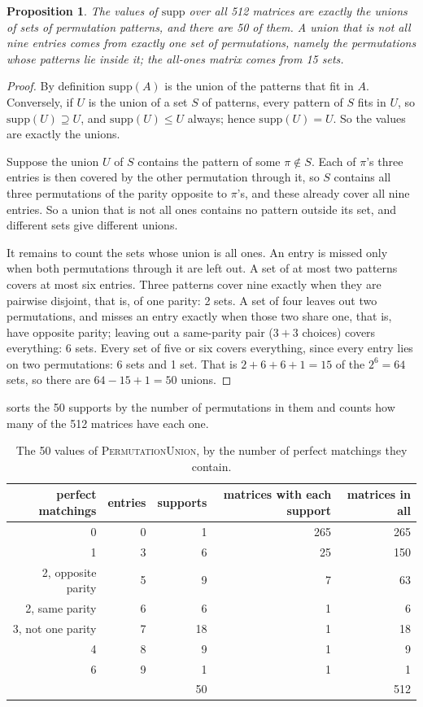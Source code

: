 \documentclass[11pt]{article}
\newtheorem{proposition}[theorem]{Proposition}
\theoremstyle{definition}
\theoremstyle{plain}
\let\origtextsc\textsc
\renewcommand{\textsc}[1]{\textup{\origtextsc{#1}}}
\begin{document}
\begin{proposition}
\label{prop:fifty}
The values of $\mathrm{supp}$ over all 512 matrices are exactly the unions of sets of permutation patterns, and there
are 50 of them. A union that is not all nine entries comes from exactly one set of permutations, namely the
permutations whose patterns lie inside it; the all-ones matrix comes from 15 sets.
\end{proposition}
\begin{proof}
By definition $\mathrm{supp}(A)$ is the union of the patterns that fit in $A$. Conversely, if $U$ is the union of a
set $S$ of patterns, every pattern of $S$ fits in $U$, so $\mathrm{supp}(U)\supseteq U$, and $\mathrm{supp}(U)\le U$
always; hence $\mathrm{supp}(U)=U$. So the values are exactly the unions.

Suppose the union $U$ of $S$ contains the pattern of some $\pi\notin S$. Each of $\pi$'s three entries is then covered by
the other permutation through it, so $S$ contains all three permutations of the parity opposite to $\pi$'s, and these
already cover all nine entries. So a union that is not all ones contains no pattern outside its set, and different
sets give different unions.

It remains to count the sets whose union is all ones. An entry is missed only when both permutations through it are
left out. A set of at most two patterns covers at most six entries. Three patterns cover nine exactly when they are
pairwise disjoint, that is, of one parity: 2 sets. A set of four leaves out two permutations, and misses an entry
exactly when those two share one, that is, have opposite parity; leaving out a same-parity pair ($3+3$ choices) covers
everything: 6 sets. Every set of five or six covers everything, since every entry lies on two permutations: 6 sets and
1 set. That is $2+6+6+1=15$ of the $2^6=64$ sets, so there are $64-15+1=50$ unions.
\end{proof}

 sorts the 50 supports by the number of permutations in them and counts how many of the 512 matrices
have each one.

\begin{table}[h]
\centering
\caption{The 50 values of \textsc{PermutationUnion}, by the number of perfect matchings they contain.}
\label{tab:fifty}
\small
\begin{tabular}{rrrrr}
\toprule
perfect matchings & entries & supports & matrices with each support & matrices in all \\
\midrule
0 & 0 & 1 & 265 & 265 \\
1 & 3 & 6 & 25 & 150 \\
2, opposite parity & 5 & 9 & 7 & 63 \\
2, same parity & 6 & 6 & 1 & 6 \\
3, not one parity & 7 & 18 & 1 & 18 \\
4 & 8 & 9 & 1 & 9 \\
6 & 9 & 1 & 1 & 1 \\
\midrule
 & & 50 & & 512 \\
\bottomrule
\end{tabular}
\end{table}
\end{document}
